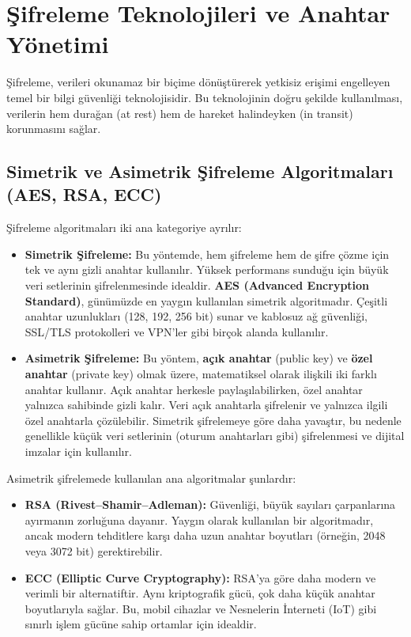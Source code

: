 \section{Şifreleme Teknolojileri ve Anahtar Yönetimi}

Şifreleme, verileri okunamaz bir biçime dönüştürerek yetkisiz erişimi engelleyen temel bir bilgi güvenliği teknolojisidir. Bu teknolojinin doğru şekilde kullanılması, verilerin hem durağan (at rest) hem de hareket halindeyken (in transit) korunmasını sağlar.

\subsection{Simetrik ve Asimetrik Şifreleme Algoritmaları (AES, RSA, ECC)}

Şifreleme algoritmaları iki ana kategoriye ayrılır:

\begin{itemize}
    \item \textbf{Simetrik Şifreleme:} Bu yöntemde, hem şifreleme hem de şifre çözme için tek ve aynı gizli anahtar kullanılır. Yüksek performans sunduğu için büyük veri setlerinin şifrelenmesinde idealdir. \textbf{AES (Advanced Encryption Standard)}, günümüzde en yaygın kullanılan simetrik algoritmadır. Çeşitli anahtar uzunlukları (128, 192, 256 bit) sunar ve kablosuz ağ güvenliği, SSL/TLS protokolleri ve VPN'ler gibi birçok alanda kullanılır.
    \item \textbf{Asimetrik Şifreleme:} Bu yöntem, \textbf{açık anahtar} (public key) ve \textbf{özel anahtar} (private key) olmak üzere, matematiksel olarak ilişkili iki farklı anahtar kullanır. Açık anahtar herkesle paylaşılabilirken, özel anahtar yalnızca sahibinde gizli kalır. Veri açık anahtarla şifrelenir ve yalnızca ilgili özel anahtarla çözülebilir. Simetrik şifrelemeye göre daha yavaştır, bu nedenle genellikle küçük veri setlerinin (oturum anahtarları gibi) şifrelenmesi ve dijital imzalar için kullanılır.
\end{itemize}

Asimetrik şifrelemede kullanılan ana algoritmalar şunlardır:

\begin{itemize}
    \item \textbf{RSA (Rivest–Shamir–Adleman):} Güvenliği, büyük sayıları çarpanlarına ayırmanın zorluğuna dayanır. Yaygın olarak kullanılan bir algoritmadır, ancak modern tehditlere karşı daha uzun anahtar boyutları (örneğin, 2048 veya 3072 bit) gerektirebilir.
    \item \textbf{ECC (Elliptic Curve Cryptography):} RSA'ya göre daha modern ve verimli bir alternatiftir. Aynı kriptografik gücü, çok daha küçük anahtar boyutlarıyla sağlar. Bu, mobil cihazlar ve Nesnelerin İnterneti (IoT) gibi sınırlı işlem gücüne sahip ortamlar için idealdir.
\end{itemize}

